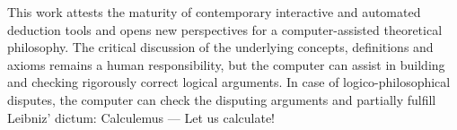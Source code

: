 \documentclass{llncs}
\begin{document}
This work attests the maturity of contemporary interactive and 
automated deduction tools and 
opens new perspectives for a computer-assisted theoretical philosophy. 
The critical discussion of the underlying 
concepts, definitions and axioms remains a human responsibility, but the computer can assist 
in building and checking rigorously correct logical arguments. In case of 
logico-philosophical disputes, the computer can check the disputing arguments
and partially fulfill Leibniz' dictum:
Calculemus --- Let us calculate!
\end{document}
